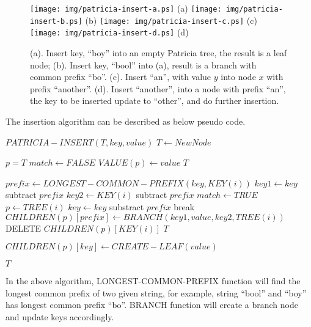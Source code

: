 \documentclass{article}
\begin{document}
\begin{figure}[htbp]
       \begin{center}
	\texttt{[image: img/patricia-insert-a.ps]} (a)
	\texttt{[image: img/patricia-insert-b.ps]} (b)
	\texttt{[image: img/patricia-insert-c.ps]} (c)
	\texttt{[image: img/patricia-insert-d.ps]} (d)
        \caption{(a). Insert key, ``boy'' into an empty Patricia tree,
	the result is a leaf node; \newline
	(b). Insert key, ``bool'' into (a), result is a branch with
	common prefix ``bo''. \newline
        (c). Insert ``an'', with value $y$ into node $x$ with prefix
	``another''. \newline
        (d). Insert ``another'', into a node with prefix ``an'', the key to be inserted update to ``other'', and do further insertion.}
        \label{fig:patricia-insert}
       \end{center}
\end{figure}

The insertion algorithm can be described as below pseudo code.

\begin{algorithmic}
\STATE $PATRICIA-INSERT(T, key, value)$
   \STATE $T \leftarrow NewNode$ \ENDIF

  \STATE $p=T$
  \LOOP
    \STATE $match \leftarrow FALSE$
        \STATE $VALUE(p) \leftarrow value$
        \RETURN $T$
      \ENDIF

      \STATE $prefix \leftarrow LONGEST-COMMON-PREFIX(key, KEY(i))$
      \STATE $key1 \leftarrow key$ subtract $prefix$
      \STATE $key2 \leftarrow KEY(i)$ subtract $prefix$
        \STATE $match \leftarrow TRUE$
          \STATE $p \leftarrow TREE(i)$
          \STATE $key \leftarrow key$ substract $prefix$
          \STATE break
        \ELSE
          \STATE $CHILDREN(p)[prefix] \leftarrow BRANCH(key1, value, key2, TREE(i))$
          \STATE DELETE $CHILDREN(p)[KEY(i)]$
          \RETURN $T$
        \ENDIF
      \ENDIF

        \STATE $CHILDREN(p)[key] \leftarrow CREATE-LEAF(value)$
      \ENDIF
    \ENDFOR

  \ENDLOOP
  \RETURN $T$
\end{algorithmic}

In the above algorithm, LONGEST-COMMON-PREFIX function will find the longest
common prefix of two given string, for example, string ``bool'' and ``boy''
has longest common prefix ``bo''. BRANCH function will create a branch node
and update keys accordingly.
\end{document}
